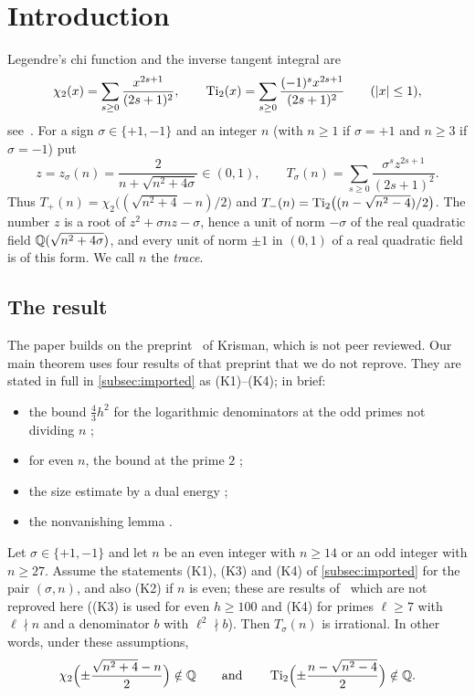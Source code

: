 \section{Introduction}\label{sec:introduction}

Legendre's chi function and the inverse tangent integral are
\[
\chi_2(x)=\sum_{s\ge0}\frac{x^{2s+1}}{(2s+1)^2},\qquad
\operatorname{Ti}_2(x)=\sum_{s\ge0}\frac{(-1)^s x^{2s+1}}{(2s+1)^2}\qquad(\left\lvert x\right\rvert\le1),
\]
see~\cite{Lewin1981}. For a sign $\sigma\in\{+1,-1\}$ and an integer $n$ (with $n\ge1$ if
$\sigma=+1$ and $n\ge3$ if $\sigma=-1$) put
\begin{equation}\label{eq:unit}
z=z_\sigma(n)=\frac{2}{n+\sqrt{n^2+4\sigma}}\in(0,1),\qquad
T_\sigma(n)=\sum_{s\ge0}\frac{\sigma^s z^{2s+1}}{(2s+1)^2}.
\end{equation}
Thus $T_+(n)=\chi_2\bigl((\sqrt{n^2+4}-n)/2\bigr)$ and $T_-(n)=\operatorname{Ti}_2\bigl((n-\sqrt{n^2-4})/2\bigr)$.
The number $z$ is a root of $z^2+\sigma nz-\sigma$, hence a unit of norm $-\sigma$ of the real
quadratic field $\mathbb{Q}(\sqrt{n^2+4\sigma})$, and every unit of norm $\pm1$ in $(0,1)$ of a real
quadratic field is of this form. We call $n$ the \emph{trace}.

\subsection{The result}\label{subsec:result}

The paper builds on the preprint~\Kri{} of Krisman, which is not peer reviewed. Our main theorem
uses four results of that preprint that we do not reprove. They are stated in full in
\cref{subsec:imported} as (K1)--(K4); in brief:
\begin{itemize}
\item[(K1)] the bound $\tfrac43h^2$ for the logarithmic denominators at the odd primes not
dividing $n$ \cite[Theorem~3.7]{Krisman2026units};
\item[(K2)] for even $n$, the bound at the prime $2$ \cite[Proposition~4.2]{Krisman2026units};
\item[(K3)] the size estimate by a dual energy \cite[Theorem~5.1]{Krisman2026units};
\item[(K4)] the nonvanishing lemma \cite[Lemmas~6.1 and~8.6]{Krisman2026units}.
\end{itemize}

\begin{theorem}\label{thm:main}
Let $\sigma\in\{+1,-1\}$ and let $n$ be an even integer with $n\ge14$ or an odd integer with
$n\ge27$. Assume the statements \textup{(K1)}, \textup{(K3)} and \textup{(K4)} of
\cref{subsec:imported} for the pair $(\sigma,n)$, and also \textup{(K2)} if $n$ is even; these
are results of~\Kri{} which are not reproved here (\textup{(K3)} is used for even $h\ge100$ and
\textup{(K4)} for primes $\ell\ge7$ with $\ell\nmid n$ and a denominator $b$ with $\ell^2\nmid b$). Then $T_\sigma(n)$ is irrational. In other
words, under these assumptions,
\[
\chi_2\Bigl(\pm\frac{\sqrt{n^2+4}-n}{2}\Bigr)\notin\mathbb{Q}
\qquad\text{and}\qquad
\operatorname{Ti}_2\Bigl(\pm\frac{n-\sqrt{n^2-4}}{2}\Bigr)\notin\mathbb{Q} .
\]
\end{theorem}

